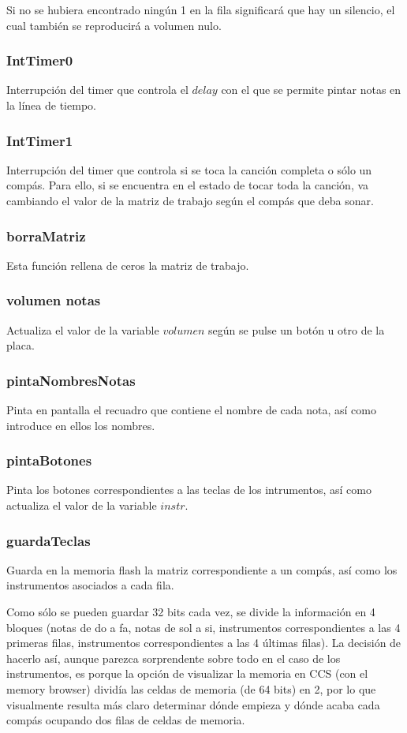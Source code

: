 \documentclass[12pt,a4paper]{article}
\begin{document}
Si no se hubiera encontrado ningún 1 en la fila significará que hay un silencio, el cual también se reproducirá a volumen nulo.

\subsubsection{IntTimer0}
Interrupción del timer que controla el $delay$ con el que se permite pintar notas en la línea de tiempo.

\subsubsection{IntTimer1}
Interrupción del timer que controla si se toca la canción completa o sólo un compás. Para ello, si se encuentra en el estado de tocar toda la canción, va cambiando el valor de la matriz de trabajo según el compás que deba sonar.

\subsubsection{borraMatriz}
Esta función rellena de ceros la matriz de trabajo.

\subsubsection{volumen notas}
Actualiza el valor de la variable $volumen$ según se pulse un botón u otro de la placa.

\subsubsection{pintaNombresNotas}
Pinta en pantalla el recuadro que contiene el nombre de cada nota, así como introduce en ellos los nombres.

\subsubsection{pintaBotones}
Pinta los botones correspondientes a las teclas de los intrumentos, así como actualiza el valor de la variable $instr$.

\subsubsection{guardaTeclas}
Guarda en la memoria flash la matriz correspondiente a un compás, así como los instrumentos asociados a cada fila.

Como sólo se pueden guardar 32 bits cada vez, se divide la información en 4 bloques (notas de do a fa, notas de sol a si, instrumentos correspondientes a las 4 primeras filas, instrumentos correspondientes a las 4 últimas filas). La decisión de hacerlo así, aunque parezca sorprendente sobre todo en el caso de los instrumentos, es porque la opción de visualizar la memoria en CCS (con el memory browser) dividía las celdas de memoria (de 64 bits) en 2, por lo que visualmente resulta más claro determinar dónde empieza y dónde acaba cada compás ocupando dos filas de celdas de memoria.
\end{document}
